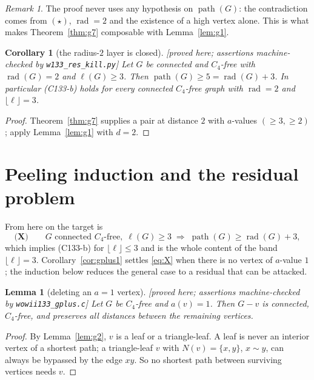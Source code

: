 \documentclass[11pt]{article}
\theoremstyle{plain}
\newtheorem{lemma}[theorem]{Lemma}
\newtheorem{corollary}[theorem]{Corollary}
\theoremstyle{definition}
\theoremstyle{remark}
\newtheorem{remark}[theorem]{Remark}
\numberwithin{equation}{section}
\newcommand{\rad}{\operatorname{rad}}
\newcommand{\pth}{\operatorname{path}}
\newcommand{\statusbox}[1]{{\small\sloppy\textsf{[#1]}}}
\newcommand{\PRV}[1]{\statusbox{proved here; assertions machine-checked by \texttt{#1}}}
\begin{document}
\begin{remark}
The proof never uses any hypothesis on $\pth(G)$: the contradiction comes from $(\star)$,
$\rad = 2$ and the existence of a high vertex alone. This is what makes
Theorem~\ref{thm:g7} composable with Lemma~\ref{lem:g1}.
\end{remark}

\begin{corollary}[the radius-$2$ layer is closed]\label{cor:g8}
\PRV{w133\_res\_kill.py}
Let $G$ be connected and $C_4$-free with $\rad(G) = 2$ and $\ell(G) \ge 3$. Then
$\pth(G) \ge 5 = \rad(G) + 3$. In particular (C133-b) holds for every connected $C_4$-free
graph with $\rad = 2$ and $\lfloor \ell\rfloor = 3$.
\end{corollary}

\begin{proof}
Theorem~\ref{thm:g7} supplies a pair at distance $2$ with $a$-values $(\ge 3,\ge 2)$; apply
Lemma~\ref{lem:g1} with $d = 2$.
\end{proof}

\section{Peeling induction and the residual problem}\label{sec:peeling}

From here on the target is
\begin{equation}\label{eq:X}
  \textbf{(X)}\qquad G \text{ connected } C_4\text{-free},\; \ell(G) \ge 3
  \;\Longrightarrow\; \pth(G) \ge \rad(G) + 3,
\end{equation}
which implies (C133-b) for $\lfloor \ell\rfloor \le 3$ and is the whole content of the band
$\lfloor\ell\rfloor = 3$. Corollary~\ref{cor:gplus1} settles \eqref{eq:X} when there is no
vertex of $a$-value $1$; the induction below reduces the general case to a residual that can
be attacked.

\begin{lemma}[deleting an $a = 1$ vertex]\label{lem:g6}
\PRV{wowii133\_gplus.c}
Let $G$ be $C_4$-free and $a(v) = 1$. Then $G - v$ is connected, $C_4$-free, and preserves
all distances between the remaining vertices.
\end{lemma}

\begin{proof}
By Lemma~\ref{lem:g2}, $v$ is a leaf or a triangle-leaf. A leaf is never an interior vertex
of a shortest path; a triangle-leaf $v$ with $N(v) = \{x,y\}$, $x \sim y$, can always be
bypassed by the edge $xy$. So no shortest path between surviving vertices needs $v$.
\end{proof}
\end{document}
